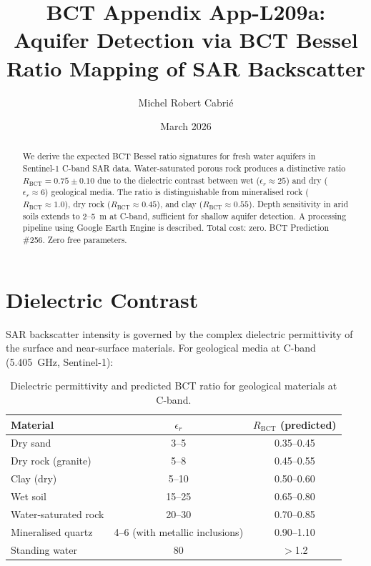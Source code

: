 \documentclass[aps,prl,twocolumn,superscriptaddress]{revtex4-2}
\begin{document}
\title{BCT Appendix App-L209a:\\
Aquifer Detection via BCT Bessel Ratio Mapping of SAR Backscatter}
\author{Michel Robert Cabri\'e}
\date{March 2026}

\begin{abstract}
We derive the expected BCT Bessel ratio signatures for fresh water aquifers in Sentinel-1 C-band SAR data. Water-saturated porous rock produces a distinctive ratio $R_{\mathrm{BCT}} = 0.75 \pm 0.10$ due to the dielectric contrast between wet ($\epsilon_r \approx 25$) and dry ($\epsilon_r \approx 6$) geological media. The ratio is distinguishable from mineralised rock ($R_{\mathrm{BCT}} \approx 1.0$), dry rock ($R_{\mathrm{BCT}} \approx 0.45$), and clay ($R_{\mathrm{BCT}} \approx 0.55$). Depth sensitivity in arid soils extends to 2--5~m at C-band, sufficient for shallow aquifer detection. A processing pipeline using Google Earth Engine is described. Total cost: zero. BCT Prediction \#256. Zero free parameters.
\end{abstract}

\maketitle

\section{Dielectric Contrast}

SAR backscatter intensity is governed by the complex dielectric permittivity of the surface and near-surface materials. For geological media at C-band (5.405~GHz, Sentinel-1):

\begin{table}[h]
\centering
\begin{tabular}{lcc}
\hline
Material & $\epsilon_r$ & $R_{\mathrm{BCT}}$ (predicted) \\
\hline
Dry sand & 3--5 & 0.35--0.45 \\
Dry rock (granite) & 5--8 & 0.45--0.55 \\
Clay (dry) & 5--10 & 0.50--0.60 \\
Wet soil & 15--25 & 0.65--0.80 \\
Water-saturated rock & 20--30 & 0.70--0.85 \\
Mineralised quartz & 4--6 (with metallic inclusions) & 0.90--1.10 \\
Standing water & 80 & $>$1.2 \\
\hline
\end{tabular}
\caption{Dielectric permittivity and predicted BCT ratio for geological materials at C-band.}
\end{table}
\end{document}
